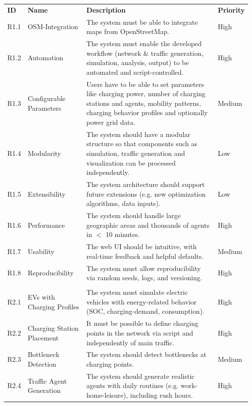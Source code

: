 \begin{longtable}{|P{1.5cm}|P{4cm}|P{8cm}|P{2cm}|}
\hline
{}
 \\
\hline
\textbf{ID} & \textbf{Name} & \textbf{Description} & \textbf{Priority} \\
\hline
R1.1 & OSM-Integration & The system must be able to integrate maps from OpenStreetMap. & High \\
\hline
R1.2 & Automation & The system must enable the developed workflow (network \& traffic generation, simulation, analysis, output) to be automated and script-controlled. & High \\
\hline
R1.3 & Configurable Parameters & Users have to be able to set parameters like charging power, number of charging stations and agents, mobility patterns, charging behavior profiles and optionally power grid data. & Medium \\
\hline
R1.4 & Modularity & The system should have a modular structure so that components such as simulation, traffic generation and visualization can be processed independently. & Low \\
\hline
R1.5 & Extensibility & The system architecture should support future extensions (e.g. new optimization algorithms, data inputs). & Low \\
\hline
R1.6 & Performance & The system should handle large geographic areas and thousands of agents in $<$ 10  minutes. & High \\
\hline
R1.7 & Usability & The web UI should be intuitive, with real-time feedback and helpful defaults. & Medium \\
\hline
R1.8 & Reproducibility & The system must allow reproducibility via random seeds, logs, and versioning. & High \\
\hline
{}
 \\
\hline
R2.1 & EVs with Charging Profiles & The system must simulate electric vehicles with energy-related behavior (SOC, charging-demand, consumption). & High \\
\hline
R2.2 & Charging Station Placement & It must be possible to define charging points in the network via script and independently of main traffic. & High \\
\hline
R2.3 & Bottleneck Detection & The system should detect bottlenecks at charging points. & Medium \\
\hline
R2.4 & Traffic Agent Generation & The system should generate realistic agents with daily routines (e.g. work-home-leisure), including rush hours. & High \\

\end{longtable}
